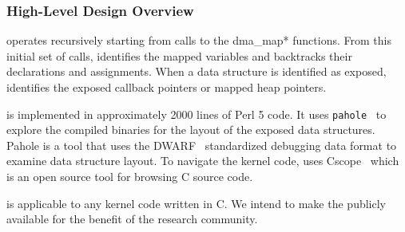 

\subsubsection{High-Level Design Overview}

\tool operates recursively starting from calls to the dma\_map* functions. From this initial set of calls, \tool identifies the mapped variables and backtracks their declarations and assignments. When a data structure is identified as exposed, \tool identifies the exposed callback pointers or mapped heap pointers. 



\tool is implemented in approximately 2000 lines of Perl 5 code. It uses \texttt{pahole}~\cite{dwarves} to explore the compiled binaries for the layout of the exposed data structures. Pahole is a tool that uses the DWARF~\cite{dwarf} standardized debugging data format to examine data structure layout. To navigate the kernel code, \tool uses Cscope~\cite{cscope,cscope_92} which is an open source tool for browsing C source code.

\tool is applicable to any kernel code written in C. We intend to make the \tool publicly available for the benefit of the research community.



